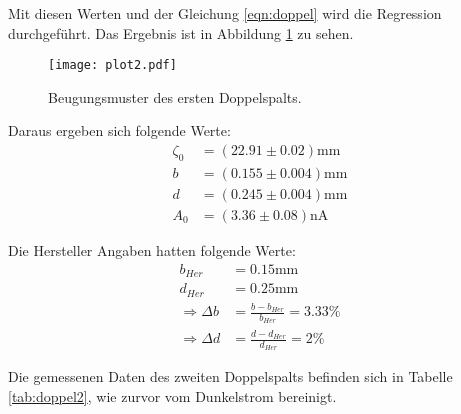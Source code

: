 Mit diesen Werten und der Gleichung \eqref{eqn:doppel} wird die Regression durchgeführt.
Das Ergebnis ist in Abbildung \ref{fig:plot2} zu sehen.

\begin{figure}
  \centering
  \texttt{[image: plot2.pdf]}
  \caption{Beugungsmuster des ersten Doppelspalts.}
  \label{fig:plot2}
\end{figure}
\FloatBarrier

Daraus ergeben sich folgende Werte:
\begin{align*}
  \zeta_0 &= (22.91 \pm 0.02) \text{mm} \\
  b &= (0.155 \pm 0.004) \text{mm} \\
  d &= (0.245 \pm 0.004) \text{mm} \\
  A_0 &= (3.36 \pm 0.08) \text{nA}
\end{align*}

Die Hersteller Angaben hatten folgende Werte:
\begin{align*}
  b_{Her} &= 0.15 \text{mm} \\
  d_{Her} &= 0.25 \text{mm} \\
  \Rightarrow \Delta b &= \frac{b - b_{Her}}{b_{Her}} = 3.33\% \\
  \Rightarrow \Delta d &= \frac{d - d_{Her}}{d_{Her}} = 2\%
\end{align*}

Die gemessenen Daten des zweiten Doppelspalts befinden sich in Tabelle \ref{tab:doppel2}, wie zurvor vom Dunkelstrom bereinigt.

